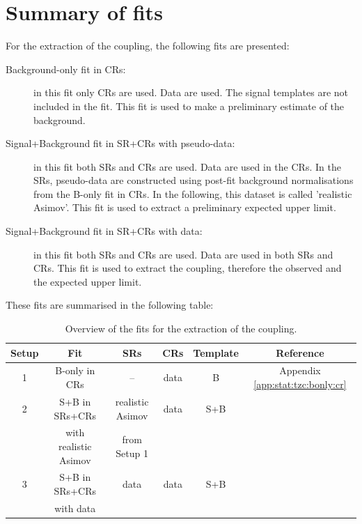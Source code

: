\section{Summary of fits}
\label{sec:stat:summary}
For the extraction of the \tZc coupling, the following fits
are presented:
\begin{description}
	\item[Background-only fit in CRs:] in this fit only CRs are used. Data are
	used. The signal templates are not included in the fit. This fit is used to make a preliminary estimate of the background.
	\item[Signal+Background fit in SR+CRs with pseudo-data:] in this fit both SRs and CRs are used.
	Data are used in the CRs. In the SRs, pseudo-data are constructed
	using post-fit background normalisations from the B-only fit in CRs. In the following, this dataset is called 'realistic Asimov'. This fit is used to extract a preliminary expected upper limit.
	\item[Signal+Background fit in SR+CRs with data:] in this fit both SRs and CRs are used. Data are used in both 
	SRs and CRs. This fit is used to extract the \tZc coupling, therefore the observed and the expected upper limit.
\end{description}
These fits are summarised in the following table:

\begin{table}[htbp]
	\small
	\centering
	\begin{tabular}{cccccc}
		\toprule
		Setup & Fit & SRs & CRs & Template & Reference \\
		\midrule
		1 & B-only in CRs & -- & data & B  & Appendix \ref{app:stat:tzc:bonly:cr} \\
		\midrule
		2 & S+B in SRs+CRs & realistic Asimov & data & S+B  & \Cref{sec:stat:tzc:splusb:crsr} \\
		& with realistic Asimov & from Setup 1 & & & \\
		\midrule
		3 & S+B in SRs+CRs & data & data & S+B  & \Cref{sec:stat:tzc:splusb:unb} \\
		& with data & & & & \\
		\bottomrule
	\end{tabular}
	\caption{
	Overview of the fits for the extraction of the \tZc coupling.}%
\label{tab:summary_fits}
\end{table}


